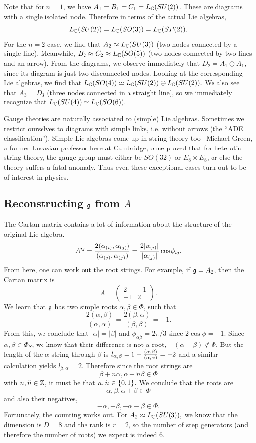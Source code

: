Note that for $n=1$, we have $A_1=B_1=C_1=L_{\mathbb{C}}(SU(2))$. These are diagrams with a single isolated node. Therefore in terms of the actual Lie algebras, $$L_{\mathbb{C}}(SU(2))=L_{\mathbb{C}}(SO(3))=L_{\mathbb{C}}(SP(2)).$$
For the $n=2$ case, we find that $A_2\approx L_{\mathbb{C}}(SU(3))$ (two nodes connected by a single line). Meanwhile, $B_2\approx C_2 \approx L_{\mathbb{C}} (SO(5))$ (two nodes connected by two lines and an arrow). From the diagrams, we observe immediately that $D_2=A_1 \oplus A_1$, since its diagram is just two disconnected nodes. Looking at the corresponding Lie algebras, we find that $L_{\mathbb{C}}(SO(4))\simeq L_{\mathbb{C}}(SU(2))\oplus L_{\mathbb{C}}(SU(2)).$ We also see that $A_3=D_3$ (three nodes connected in a straight line), so we immediately recognize that $L_{\mathbb{C}}(SU(4))\simeq L_{\mathbb{C}}(SO(6)).$

Gauge theories are naturally associated to (simple) Lie algebras. Sometimes we restrict ourselves to diagrams with simple links, i.e. without arrows (the ``ADE classification''). Simple Lie algebras come up in string theory too-- Michael Green, a former Lucasian professor here at Cambridge, once proved that for heterotic string theory, the gauge group must either be $SO(32)$ or $E_8\times E_8$, or else the theory suffers a fatal anomaly. Thus even these exceptional cases turn out to be of interest in physics.

\subsection*{Reconstructing $\mathfrak{g}$ from $A$} The Cartan matrix contains a lot of information about the structure of the original Lie algebra.
$$A^{ij}=\frac{2(\alpha_{(i)},\alpha_{(j)})}{(\alpha_{(j)},\alpha_{(j)})}=\frac{2|\alpha_{(i)}|}{|\alpha_{(j)}|}\cos\phi_{ij}.$$
From here, one can work out the root strings. For example, if $\mathfrak{g}=A_2$, then the Cartan matrix is
$$A=\begin{pmatrix}
2&-1\\-1&2
\end{pmatrix}.$$
We learn that $\mathfrak{g}$ has two simple roots $\alpha,\beta \in \Phi$, such that
$$\frac{2(\alpha,\beta)}{(\alpha,\alpha)}=\frac{2(\beta,\alpha)}{(\beta,\beta)}=-1.$$
From this, we conclude that $|\alpha|=|\beta|$ and $\phi_{\alpha\beta}=2\pi/3$ since $2\cos\phi=-1$.
Since $\alpha,\beta\in \Phi_S$, we know that their difference is not a root, $\pm(\alpha-\beta)\notin \Phi.$ But the length of the $\alpha$ string through $\beta$ is
$l_{\alpha,\beta}=1-\frac{(\alpha,\beta)}{(\alpha,\alpha)}=+2$ and a similar calculation yields $l_{\beta,\alpha}=2$. Therefore since the root strings are
$$\beta+n\alpha, \alpha+\tilde n\beta \in \Phi$$
with $n,\tilde n \in \mathbb{Z}$, it must be that $n,\tilde n\in \{0,1\}.$ We conclude that the roots are
$$\alpha,\beta,\alpha+\beta\in \Phi$$
and also their negatives,
$$-\alpha,-\beta,-\alpha-\beta\in \Phi.$$
Fortunately, the counting works out. For $A_2\approx L_{\mathbb{C}}(SU(3)),$ we know that the dimension is $D=8$ and the rank is $r=2$, so the number of step generators (and therefore the number of roots) we expect is indeed 6.

